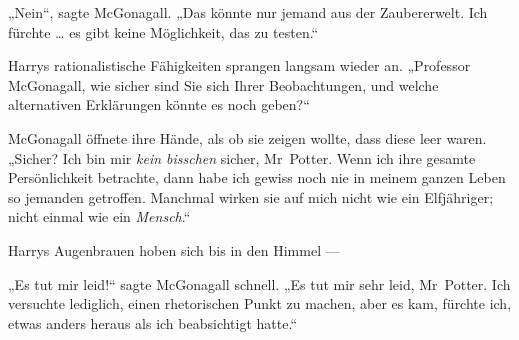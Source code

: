 „Nein“, sagte McGonagall.
„Das könnte nur jemand aus der Zaubererwelt. Ich fürchte … es gibt keine Möglichkeit, das zu testen.“

Harrys rationalistische Fähigkeiten sprangen langsam wieder an.
„Professor McGonagall, wie sicher sind Sie sich Ihrer Beobachtungen, und welche alternativen Erklärungen könnte es noch geben?“

McGonagall öffnete ihre Hände, als ob sie zeigen wollte, dass diese leer waren.
„Sicher? Ich bin mir \emph{kein bisschen} sicher, Mr~Potter. Wenn ich ihre gesamte Persönlichkeit betrachte, dann habe ich gewiss noch nie in meinem ganzen Leben so jemanden getroffen. Manchmal wirken sie auf mich nicht wie ein Elfjähriger; nicht einmal wie ein \emph{Mensch}.“

Harrys Augenbrauen hoben sich bis in den Himmel —

„Es tut mir leid!“ sagte McGonagall schnell.
„Es tut mir sehr leid, Mr~Potter. Ich versuchte lediglich, einen rhetorischen Punkt zu machen, aber es kam, fürchte ich, etwas anders heraus als ich beabsichtigt hatte.“

